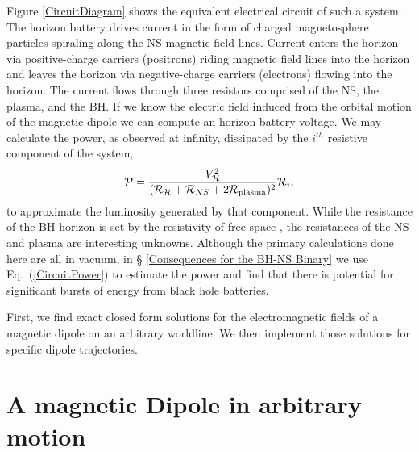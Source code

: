 Figure \ref{CircuitDiagram}  shows the equivalent electrical circuit
of such a system. The horizon battery drives current in the form of
charged magnetosphere particles spiraling along the NS
magnetic field lines. Current enters the horizon via positive-charge
carriers (positrons) riding magnetic field lines into the horizon and
leaves the horizon via negative-charge carriers (electrons) flowing
into the horizon. The current flows through three resistors comprised of
the NS, the plasma, and the BH. If we know the electric field
induced from the orbital motion of the magnetic dipole we can compute
an horizon battery voltage. We may calculate the power, as observed at infinity, dissipated
by the $i^{th}$ resistive component of the system, 
\begin{align}
\label{CircuitPower}
\mathcal{P} =  \frac{  V^2_{\mathcal{H}}  }{( \mathcal{R}_{\mathcal{H}} + \mathcal{R}_{NS} + 2\mathcal{R}_{\rm{plasma}})^2 } \mathcal{R}_{i} ,
\end{align}
to approximate the luminosity generated by that component.
While the resistance of the BH horizon is set by the resistivity of
free space \cite{MPBook}, 
the resistances of the NS and plasma are interesting unknowns.
Although the primary calculations done here are all in vacuum, in \S
\ref{Consequences for the BH-NS Binary} we 
use Eq.\ (\ref{CircuitPower}) to estimate the power and
find that there is potential for significant bursts of energy from
black hole batteries.

First, we find exact closed form solutions for the
electromagnetic fields of a magnetic dipole on an arbitrary
worldline. We then implement those
solutions for specific dipole trajectories.


\section{A magnetic Dipole in arbitrary motion}
\label{Text:Solutions}

